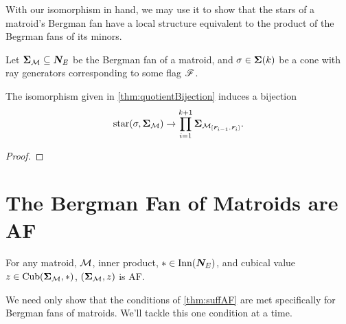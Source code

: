 \documentclass[12pt,oneside]{../../sfsuthesis}
\begin{document}
With our isomorphism in hand, we may use it to show that the stars of a matroid's Bergman fan have a local structure equivalent to the product of the Begrman fans of its minors.

\begin{lemma}\th\label{thm:starBijection}
    Let \( \bm{\Sigma}_{\mathcal{M}} \subseteq \bm{N}_E \) be the Bergman fan of a matroid,
    and \( \sigma \in \bm{\Sigma}(k) \) be a cone with ray generators corresponding to some flag \( \mathscr{F} \).

    The isomorphism given in \th\ref{thm:quotientBijection} induces a bijection
    \[
        \operatorname{star}(\sigma, \bm{\Sigma}_{\mathcal{M}}) \to \prod_{i=1}^{k+1} \bm{\Sigma}_{\mathcal{M}_{[F_{i-1}, F_i]}}.
    \]
\end{lemma}
\begin{proof}
\end{proof}

\section{The Bergman Fan of Matroids are AF}


\begin{theorem}
    For any matroid, \( \mathcal{M} \), inner product, \( \ast \in \mathrm{Inn}(\bm{N}_E) \), and cubical value \( z \in \operatorname{Cub}(\bm{\Sigma}_{\mathcal{M}}, \ast) \),
    \( (\bm{\Sigma}_{\mathcal{M}}, z) \) is AF.
\end{theorem}

We need only show that the conditions of \th\ref{thm:suffAF} are met specifically for Bergman fans of matroids.
We'll tackle this one condition at a time.
\end{document}

